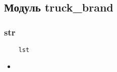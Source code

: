 \subsection{Модуль truck\_brand}

\subsubsection{str}

\begin{lstlisting}
    lst
\end{lstlisting}

\begin{itemize}
    \item \verb||
\end{itemize}

